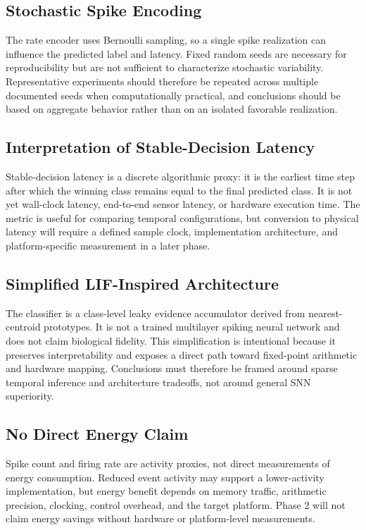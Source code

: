 \subsection{Stochastic Spike Encoding}

The rate encoder uses Bernoulli sampling, so a single spike realization can influence the predicted label and latency. Fixed random seeds are necessary for reproducibility but are not sufficient to characterize stochastic variability. Representative experiments should therefore be repeated across multiple documented seeds when computationally practical, and conclusions should be based on aggregate behavior rather than on an isolated favorable realization.

\subsection{Interpretation of Stable-Decision Latency}

Stable-decision latency is a discrete algorithmic proxy: it is the earliest time step after which the winning class remains equal to the final predicted class. It is not yet wall-clock latency, end-to-end sensor latency, or hardware execution time. The metric is useful for comparing temporal configurations, but conversion to physical latency will require a defined sample clock, implementation architecture, and platform-specific measurement in a later phase.

\subsection{Simplified LIF-Inspired Architecture}

The classifier is a class-level leaky evidence accumulator derived from nearest-centroid prototypes. It is not a trained multilayer spiking neural network and does not claim biological fidelity. This simplification is intentional because it preserves interpretability and exposes a direct path toward fixed-point arithmetic and hardware mapping. Conclusions must therefore be framed around sparse temporal inference and architecture tradeoffs, not around general SNN superiority.

\subsection{No Direct Energy Claim}

Spike count and firing rate are activity proxies, not direct measurements of energy consumption. Reduced event activity may support a lower-activity implementation, but energy benefit depends on memory traffic, arithmetic precision, clocking, control overhead, and the target platform. Phase 2 will not claim energy savings without hardware or platform-level measurements.

